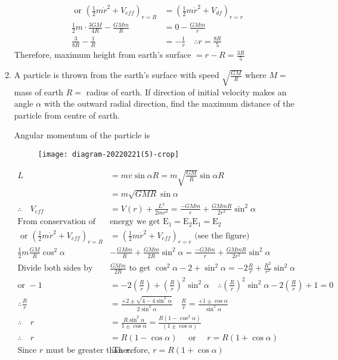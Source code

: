 \begin{enumerate}
\begin{answer}
\begin{align*}
		\text { or }\left(\frac{1}{2} m \dot{r}^{2}+V_{e f f}\right)_{r=R}&=\left(\frac{1}{2} m \dot{r}^{2}+V_{d f}\right)_{r=r} \\
		\frac{1}{2} m \cdot \frac{3 G M}{4 R}-\frac{G M m}{R}&=0-\frac{G M m}{r} \\
		\frac{3}{8 R}-\frac{1}{R}&=-\frac{1}{r} \quad \therefore r=\frac{8 R}{5}
		\end{align*}
		Therefore, maximum height from earth's surface $=r-R=\frac{3 R}{5}$
	\end{answer}
	\item  A particle is thrown from the earth's surface with speed $\sqrt{\frac{G M}{R}}$ where $M=$ mass of earth
	$R=$ radius of earth. If direction of initial velocity makes an angle $\alpha$ with the outward radial direction, find the maximum distance of the particle from centre of earth.
	\begin{answer}
		Angular momentum of the particle is
		\begin{figure}[H]
			\centering
			\texttt{[image: diagram-20220221(5)-crop]}
		\end{figure}
		\begin{align*}
		L &=m v \sin \alpha R=m \sqrt{\frac{G M}{R}} \sin \alpha R \\
		&=m \sqrt{G M R} \sin \alpha \\
		\therefore \quad V_{e f f} &=V(r)+\frac{L^{2}}{2 m r^{2}}=\frac{-G M m}{r}+\frac{G M m R}{2 r^{2}} \sin ^{2} \alpha\\
		\text{From conservation of }&\text{energy we get } \mathrm{E}_{1}=\mathrm{E}_{2}\mathrm{E}_{1}=\mathrm{E}_{2}\\
		\text{	or }\left(\frac{1}{2} m \dot{r}^{2}+V_{e f f}\right)_{r=R}&=\left(\frac{1}{2} m \dot{r}^{2}+V_{e f f}\right)_{r=r}\text{ (see the figure)}\\
		\frac{1}{2} m \frac{G M}{R} \cos ^{2} \alpha&-\frac{G M m}{R}+\frac{G M m}{2 R} \sin ^{2} \alpha=\frac{-G M m}{r}+\frac{G M m R}{2 r^{2}} \sin ^{2} \alpha\\
		\text{Divide both sides by }&\frac{G M m}{2 R}\text{ to get }\cos ^{2} \alpha-2+\sin ^{2} \alpha=-2 \frac{R}{r}+\frac{R^{2}}{r^{2}} \sin ^{2} \alpha\\
		\text{or }-1&=-2\left(\frac{R}{r}\right)+\left(\frac{R}{r}\right)^{2} \sin ^{2} \alpha \quad \therefore\left(\frac{R}{r}\right)^{2} \sin ^{2} \alpha-2\left(\frac{R}{r}\right)+1=0\\
		\therefore \frac{R}{r}&=\frac{+2 \pm \sqrt{4-4 \sin ^{2} \alpha}}{2 \sin ^{2} \alpha} \quad \frac{R}{r}=\frac{+1 \pm \cos \alpha}{\sin ^{2} \alpha} \\
		\therefore\quad r&=\frac{R \sin ^{2} \alpha}{1 \pm \cos \alpha}=\frac{R\left(1-\cos ^{2} \alpha\right)}{(1 \pm \cos \alpha)} \\
		\therefore\quad r&=R(1-\cos \alpha) \quad \text { or } \quad r=R(1+\cos \alpha)\\
		\text{Since $r$ must be greater than $r$.}&\text{ Therefore, $r=R(1+\cos \alpha)$}
		\end{align*}
		

\end{answer}
\end{enumerate}
